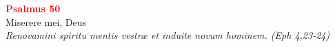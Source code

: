 


\def\greinitialformat#1{%
{\fontsize{39}{39}\selectfont #1}%
}




\vspace{0.3cm}
\begin{center}
 \textcolor{red}{\large \bf Psalmus 50}\\
Miserere mei, Deus\\
\textit{\small Renovamini spiritu mentis vestræ et induite novum hominem. (Eph 4,23-24)}
\end{center}
